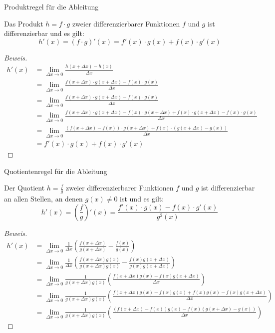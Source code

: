 \begin{frame}{Produktregel für die Ableitung}
	\begin{theorem}
		Das Produkt $h=f \cdot g$ zweier differenzierbarer Funktionen $f$ und $g$ ist differenzierbar und es gilt:
		\[
		h'(x)=\left( f\cdot g \right)' (x) = f'(x)\cdot g(x) + f(x)\cdot g'(x) 
		\]
	\end{theorem}
	\begin{proof}[Beweis]{
\tiny

 		\begin{align*}
		h'(x) & = \lim_{\Delta x \to 0} \frac{h(x+\Delta x) - h(x)}{\Delta x} \\
		& = \lim_{\Delta x \to 0} \frac{f(x+\Delta x)\cdot g(x+\Delta x) - f(x)\cdot g(x)}{\Delta x} \\
		& = \lim_{\Delta x \to 0} \frac{f(x+\Delta x)\cdot g(x+\Delta x) - f(x)\cdot g(x)}{\Delta x} \\
		& = \lim_{\Delta x \to 0} \frac{f(x+\Delta x)\cdot g(x+\Delta x) - f(x)\cdot g(x+\Delta x) + f(x)\cdot g(x+\Delta x)- f(x)\cdot g(x)}{\Delta x}  \\			
		& = \lim_{\Delta x \to 0} \frac{\left( f(x+\Delta x) - f(x)\right)\cdot g(x+\Delta x) + f(x)\cdot \left( g(x+\Delta x) - g(x)\right)}{\Delta x}  \\			
		& = f'(x)\cdot g(x) + f(x)\cdot g'(x)
		\end{align*}}
	\end{proof}
\end{frame}

\begin{frame}{Quotientenregel für die Ableitung}

{\small	\begin{theorem}
		Der Quotient $h=\frac{f}{g}$ zweier differenzierbarer Funktionen $f$ und $g$ ist differenzierbar an allen Stellen, an denen $g(x)\neq 0$ ist und es gilt:
		\[
		h'(x)=\left( \frac{f}{g} \right)' (x) = \frac{f'(x)\cdot g(x) - f(x)\cdot g'(x)}{g^{2}(x)} 
		\]
	\end{theorem}
}	\begin{proof}[Beweis]{\tiny
		\begin{align*}
		h'(x) & = \lim_{\Delta x \to 0 } \frac{1}{\Delta x} \left( \frac{f(x+\Delta x)}{g(x+\Delta x)} - \frac{f(x)}{g(x)} \right) \\
		&= \lim_{\Delta x \to 0 } \frac{1}{\Delta x} \left( \frac{f(x+\Delta x) g(x)}{g(x+\Delta x) g(x)} - \frac{f(x)g(x+\Delta x)}{g(x)g(x+\Delta x)} \right) \\
		&= \lim_{\Delta x \to 0 } \frac{1}{g(x+\Delta x) g(x)} \left( \frac{f(x+\Delta x) g(x)- f(x)g(x+\Delta x)}{\Delta x} \right) \\
		&= \lim_{\Delta x \to 0 } \frac{1}{g(x+\Delta x) g(x)} \left( \frac{f(x+\Delta x) g(x)-f(x)g(x)+f(x)g(x)- f(x)g(x+\Delta x)}{\Delta x} \right) \\
		&= \lim_{\Delta x \to 0 } \frac{1}{g(x+\Delta x) g(x)} \left(  \frac{\left(f(x+\Delta x) -f(x)\right) g(x)-f(x)\left( g(x+\Delta x) -g(x)\right) }{\Delta x} \right) 				
\end{align*}}
	\end{proof}
\end{frame}

